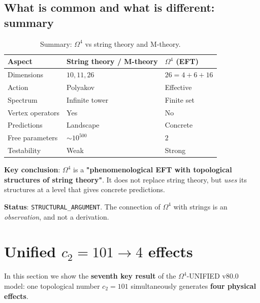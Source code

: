 \documentclass[11pt,a4paper]{article}
\newcommand{\Om}{\ensuremath{\Omega^4}}
\theoremstyle{definition}
\begin{document}
\subsection{What is common and what is different: summary}
\label{subsec:string-summary}

\begin{table}[ht]
\centering
\caption{Summary: \texorpdfstring{$\Om$}{} vs string theory and M-theory.}
\label{tab:string-final-summary}
\begin{tabular}{p{3cm}p{4cm}p{4cm}}
\toprule
Aspect & String theory / M-theory & $\Om$ (EFT) \\
\midrule
Dimensions & $10, 11, 26$ & $26 = 4 + 6 + 16$ \\
Action & Polyakov & Effective \\
Spectrum & Infinite tower & Finite set \\
Vertex operators & Yes & No \\
Predictions & Landscape & Concrete \\
Free parameters & $\sim 10^{500}$ & $2$ \\
Testability & Weak & Strong \\
\bottomrule
\end{tabular}
\end{table}

\medskip\noindent
\textbf{Key conclusion}: $\Om$ is
a \textbf{"phenomenological EFT with topological structures
of string theory"}. It does not replace string theory, but
\emph{uses} its structures at a level that gives concrete
predictions.

\medskip\noindent
\textbf{Status}: \texttt{STRUCTURAL\_ARGUMENT}. The connection
of $\Om$ with strings is an \emph{observation}, and not a derivation.

\section{Unified \texorpdfstring{$c_2 = 101 \to 4$}{c2 = 101 -> 4} effects}
\label{sec:unified-c2}

In this section we show the \textbf{seventh key result}
of the $\Om$-UNIFIED v80.0 model: one topological number $c_2 = 101$
simultaneously generates \textbf{four physical effects}.
\end{document}
